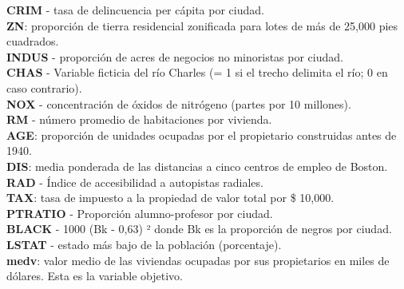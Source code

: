 \documentclass[11pt]{article}
\begin{document}
\textbf{CRIM} - tasa de delincuencia per cápita por ciudad.\\
\textbf{ZN}: proporción de tierra residencial zonificada para lotes de
más de 25,000 pies cuadrados.\\
\textbf{INDUS} - proporción de acres de negocios no minoristas por
ciudad.\\
\textbf{CHAS} - Variable ficticia del río Charles (= 1 si el trecho
delimita el río; 0 en caso contrario).\\
\textbf{NOX} - concentración de óxidos de nitrógeno (partes por 10
millones).\\
\textbf{RM} - número promedio de habitaciones por vivienda.\\
\textbf{AGE}: proporción de unidades ocupadas por el propietario
construidas antes de 1940.\\
\textbf{DIS}: media ponderada de las distancias a cinco centros de
empleo de Boston.\\
\textbf{RAD} - Índice de accesibilidad a autopistas radiales.\\
\textbf{TAX}: tasa de impuesto a la propiedad de valor total por \$
10,000.\\
\textbf{PTRATIO} - Proporción alumno-profesor por ciudad.\\
\textbf{BLACK} - 1000 (Bk - 0,63) ² donde Bk es la proporción de negros
por ciudad.\\
\textbf{LSTAT} - estado más bajo de la población (porcentaje).\\
\textbf{medv}: valor medio de las viviendas ocupadas por sus
propietarios en miles de dólares. Esta es la variable objetivo.
\end{document}
